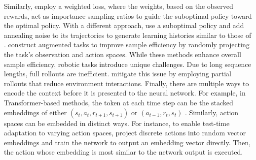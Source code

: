 \documentclass{article}
\begin{document}
Similarly, \citet{dongInContextReinforcementLearning2024} employ a weighted loss, where the weights, based on the observed rewards, act as importance sampling ratios to guide the suboptimal policy toward the optimal policy.
With a different approach, \citet{zismanEmergenceContextReinforcement2023} use a suboptimal policy and add annealing noise to its trajectories to generate learning histories similar to those of \citet{laskinContextReinforcementLearning2022}.
\citet{kirschGeneralPurposeContextLearning2023} construct augmented tasks to improve sample efficiency by randomly projecting the task's observation and action spaces.
While these methods enhance overall sample efficiency, robotic tasks introduce unique challenges. Due to long sequence lengths, full rollouts are inefficient.
\citet{elawadyReLICRecipe64k2024} mitigate this issue by employing partial rollouts that reduce environment interactions.
Finally, there are multiple ways to encode the context before it is presented to the neural network.
For example, in Transformer-based methods,
the token at each time step can be the stacked embeddings of either
$(s_t,a_t,r_{t+1},s_{t+1})$ \citep{kirschGeneralPurposeContextLearning2023,leeSupervisedPretrainingCan2023} or $(a_{t-1}, r_t, s_t)$ \citep{laskinContextReinforcementLearning2022,raparthyGeneralizationNewSequential2023,zismanEmergenceContextReinforcement2023}.
Similarly, action spaces can be embedded in distinct ways.
For instance, to enable test-time adaptation to varying action spaces, \citet{siniiContextReinforcementLearning2024} project discrete actions into random vector embeddings and
train the network to output an embedding vector directly.
Then, the action whose embedding is most similar to the network output is executed.
\end{document}
